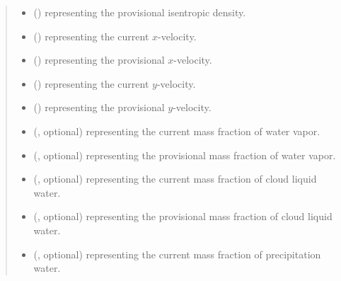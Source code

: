 \documentclass[letterpaper,10pt,english]{sphinxmanual}
\begin{document}
\begin{fulllineitems}
\begin{fulllineitems}
\begin{quote}
\begin{description}
\begin{itemize}
\item {} 
 () \textendash{}  representing the provisional isentropic density.

\item {} 
 () \textendash{}  representing the current \(x\)-velocity.

\item {} 
 () \textendash{}  representing the provisional \(x\)-velocity.

\item {} 
 () \textendash{}  representing the current \(y\)-velocity.

\item {} 
 () \textendash{}  representing the provisional \(y\)-velocity.

\item {} 
 (, optional) \textendash{}  representing the current mass fraction of water vapor.

\item {} 
 (, optional) \textendash{}  representing the provisional mass fraction of water vapor.

\item {} 
 (, optional) \textendash{}  representing the current mass fraction of cloud liquid water.

\item {} 
 (, optional) \textendash{}  representing the provisional mass fraction of cloud liquid water.

\item {} 
 (, optional) \textendash{}  representing the current mass fraction of precipitation water.


\end{itemize}
\end{description}
\end{quote}
\end{fulllineitems}
\end{fulllineitems}
\end{document}
